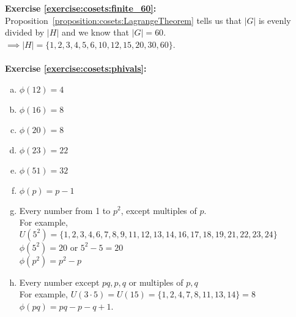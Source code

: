 \noindent\textbf{Exercise \ref{exercise:cosets:finite_60}:}
\\
Proposition~\ref{proposition:cosets:LagrangeTheorem} tells us that $|G|$ is evenly divided by $|H|$ and we know that $|G| = 60$.
\\
$\implies |H| = \{1, 2, 3, 4, 5, 6, 10, 12, 15, 20, 30, 60\}$.
\\
\\
\noindent\textbf{Exercise \ref{exercise:cosets:phivals}:}
\begin{enumerate}[(a)]
\item
$\phi(12) = 4$ 

\item
$\phi(16) = 8$
 
\item
$\phi(20) = 8$

\item
$\phi(23) = 22$

\item
$\phi(51) = 32$

\item
$\phi(p) = p - 1$

\item
Every number from 1 to $p^2$, except multiples of $p$. 
\\
For example, $U(5^2) = \{1, 2, 3, 4, 6, 7, 8, 9, 11, 12, 13, 14, 16, 17, 18, 19, 21, 22, 23, 24\}$
\\
$\phi(5^2) = 20$ or $5^2 - 5 = 20$
\\ 
$\phi(p^2) = p^2 - p$


\item
Every number except $pq, p, q$ or multiples of $p, q$
\\
For example, $U(3 \cdot 5) = U(15) = \{1, 2, 4, 7, 8, 11, 13, 14\} = 8$
\\
$\phi(pq) = pq - p - q + 1$.
\end{enumerate}

